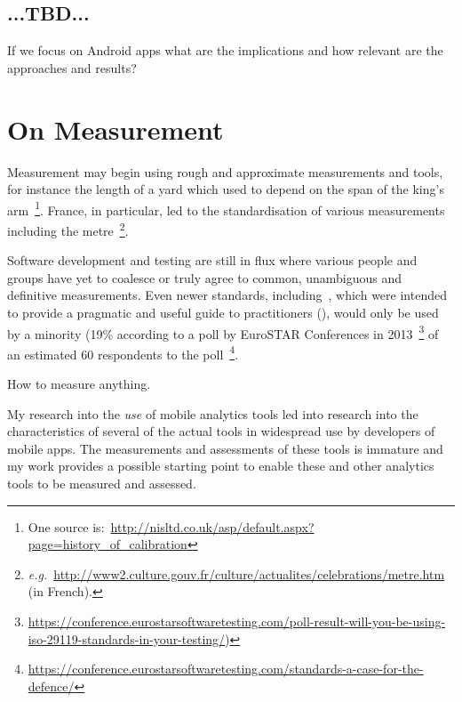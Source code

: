 \subsection{...TBD...}
If we focus on Android apps what are the implications and how relevant are the approaches and results?

\section{On Measurement}
Measurement may begin using rough and approximate measurements and tools, for instance the length of a yard which used to depend on the span of the king's arm~\footnote{One source is:~\url{http://nisltd.co.uk/asp/default.aspx?page=history_of_calibration}}. France, in particular, led to the standardisation of various measurements including the metre~\footnote{\emph{e.g.}~\url{http://www2.culture.gouv.fr/culture/actualites/celebrations/metre.htm} (in French).}.

Software development and testing are still in flux where various people and groups have yet to coalesce or truly agree to common, unambiguous and definitive measurements. Even newer standards, including~\cite{iso29119-1-2013}, which were intended to provide a pragmatic and useful guide to practitioners (\cite{reid2012_iso29119_eurostar}), would only be used by a minority (19\% according to a poll by EuroSTAR Conferences in 2013~\footnote{\url{https://conference.eurostarsoftwaretesting.com/poll-result-will-you-be-using-iso-29119-standards-in-your-testing/})} of an estimated 60 respondents to the poll~\footnote{\url{https://conference.eurostarsoftwaretesting.com/standards-a-case-for-the-defence/}}.

How to measure anything. 

My research into the \emph{use} of mobile analytics tools led into research into the characteristics of several of the actual tools in widespread use by developers of mobile apps. The measurements and assessments of these tools is immature and my work provides a possible starting point to enable these and other analytics tools to be measured and assessed.

